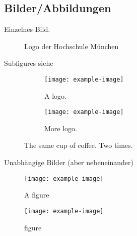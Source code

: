 \subsection{Bilder/Abbildungen}\label{subsec:abbildungen}
	
Einzelnes Bild.\autocite{higgins1996activation}
	
\begin{figure}[H]
	\centering
	\begin{minipage}{0.6\textwidth}
		\centering
	\end{minipage}
	\caption{Logo der Hochschule München}
  	\label{fig:logo}
\end{figure}
	
Subfigures siehe 
	
\begin{figure}[H]
  	\centering
  	\begin{subfigure}[b]{0.4\textwidth}
    	\texttt{[image: example-image]}
    	\caption{A logo.}
  	\end{subfigure}
  	\begin{subfigure}[b]{0.4\textwidth}
    	\texttt{[image: example-image]}
    	\sourceplaceholder
    	\caption{More logo.}
  	\end{subfigure}
  	\caption{The same cup of coffee. Two times.}
  	\label{fig:coffee}
\end{figure}
	
Unabhängige Bilder (aber nebeneinander)
	
\begin{figure}[H]
	\centering
	\begin{minipage}{.5\textwidth}
  		\centering
  		\texttt{[image: example-image]}
  		\caption{A figure}
  		\label{fig:test1}
	\end{minipage}%
	\begin{minipage}{.5\textwidth}
  		\centering
  		\texttt{[image: example-image]}
  		\caption{figure}
  		\label{fig:test2}
	\end{minipage}
\end{figure}